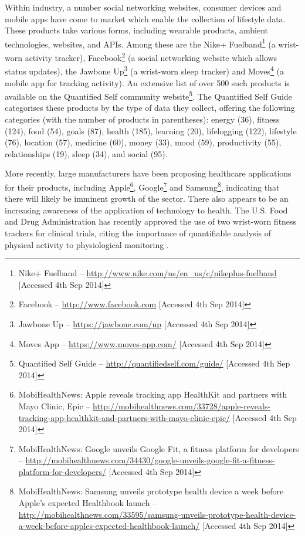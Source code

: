 \documentclass[a4paper]{scrartcl}     %
\begin{document}
      Within industry, a number social networking websites, consumer devices and mobile apps have come to market which enable the collection of lifestyle data. These products take various forms, including wearable products, ambient technologies, websites, and APIs. Among these are the Nike+ Fuelband\footnote{Nike+ Fuelband -- \url{http://www.nike.com/us/en_us/c/nikeplus-fuelband} [Accessed 4th Sep 2014]} (a wrist-worn activity tracker), Facebook\footnote{Facebook -- \url{http://www.facebook.com} [Accessed 4th Sep 2014]} (a social networking website which allows status updates), the Jawbone Up\footnote{Jawbone Up -- \url{https://jawbone.com/up} [Accessed 4th Sep 2014]} (a wrist-worn sleep tracker) and Moves\footnote{Moves App -- \url{https://www.moves-app.com/} [Accessed 4th Sep 2014]} (a mobile app for tracking activity). An extensive list of over 500 such products is available on the Quantified Self community website\footnote{Quantified Self Guide -- \url{http://quantifiedself.com/guide/} [Accessed 4th Sep 2014]}.  The Quantified Self Guide categorises these products by the type of data they collect, offering the following categories (with the number of products in parentheses): energy (36), fitness (124), food (54), goals (87), health (185), learning (20), lifelogging (122), lifestyle (76), location (57), medicine (60), money (33), mood (59), productivity (55), relationships (19), sleep (34), and social (95).

      More recently, large manufacturers have been proposing healthcare applications for their products, including Apple\footnote{MobiHealthNews: Apple reveals tracking app HealthKit and partners with Mayo Clinic, Epic -- \url{http://mobihealthnews.com/33728/apple-reveals-tracking-app-healthkit-and-partners-with-mayo-clinic-epic/} [Accessed 4th Sep 2014]}, Google\footnote{MobiHealthNews: Google unveils Google Fit, a fitness platform for developers -- \url{http://mobihealthnews.com/34430/google-unveils-google-fit-a-fitness-platform-for-developers/} [Accessed 4th Sep 2014]} and Samsung\footnote{MobiHealthNews: Samsung unveils prototype health device a week before Apple’s expected Healthbook launch -- \url{http://mobihealthnews.com/33595/samsung-unveils-prototype-health-device-a-week-before-apples-expected-healthbook-launch/} [Accessed 4th Sep 2014]}, indicating that there will likely be imminent growth of the sector. There also appears to be an increasing awareness of the application of technology to health. The U.S. Food and Drug Administration has recently approved the use of two wrist-worn fitness trackers for clinical trials, citing the importance of quantifiable analysis of physical activity to physiological monitoring \citep{U.S.FoodandDrugAdministration2014}.
\end{document}
